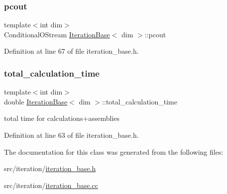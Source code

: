 \mbox{\label{class_iteration_base_ab057491553962560cfad06f19fb00ff5}} 
\subsubsection{\texorpdfstring{pcout}{pcout}}
{\footnotesize\ttfamily template$<$int dim$>$ \\
Conditional\+O\+Stream \hyperlink{class_iteration_base}{Iteration\+Base}$<$ dim $>$\+::pcout\hspace{0.3cm}{\ttfamily [protected]}}



Definition at line 67 of file iteration\+\_\+base.\+h.

\mbox{\label{class_iteration_base_a98cf351c6b85b6bbdc68c914ecdaaf1e}} 
\subsubsection{\texorpdfstring{total\+\_\+calculation\+\_\+time}{total\_calculation\_time}}
{\footnotesize\ttfamily template$<$int dim$>$ \\
double \hyperlink{class_iteration_base}{Iteration\+Base}$<$ dim $>$\+::total\+\_\+calculation\+\_\+time\hspace{0.3cm}{\ttfamily [protected]}}

total time for calculations+assemblies 

Definition at line 63 of file iteration\+\_\+base.\+h.



The documentation for this class was generated from the following files\+:\begin{DoxyCompactItemize}
\item 
src/iteration/\hyperlink{iteration__base_8h}{iteration\+\_\+base.\+h}\item 
src/iteration/\hyperlink{iteration__base_8cc}{iteration\+\_\+base.\+cc}\end{DoxyCompactItemize}
